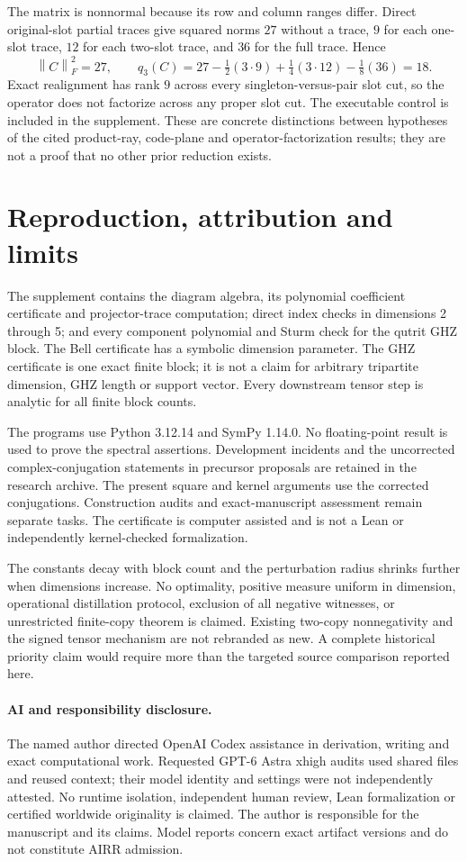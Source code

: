 \documentclass[11pt,a4paper]{article}
\newcommand{\norm}[1]{\left\lVert#1\right\rVert}
\begin{document}
The matrix is nonnormal because its row and column ranges differ. Direct original-slot partial traces give squared norms $27$ without a trace, $9$ for each one-slot trace, $12$ for each two-slot trace, and $36$ for the full trace. Hence
\[
 \norm C_F^2=27,\qquad q_3(C)=27-\tfrac12(3\cdot9)
                    +\tfrac14(3\cdot12)-\tfrac18(36)=18.
\]
Exact realignment has rank $9$ across every singleton-versus-pair slot cut, so the operator does not factorize across any proper slot cut. The executable control is included in the supplement. These are concrete distinctions between hypotheses of the cited product-ray, code-plane and operator-factorization results; they are not a proof that no other prior reduction exists.

\section{Reproduction, attribution and limits}
The supplement contains the diagram algebra, its polynomial coefficient certificate and projector-trace computation; direct index checks in dimensions 2 through 5; and every component polynomial and Sturm check for the qutrit GHZ block. The Bell certificate has a symbolic dimension parameter. The GHZ certificate is one exact finite block; it is not a claim for arbitrary tripartite dimension, GHZ length or support vector. Every downstream tensor step is analytic for all finite block counts.

The programs use Python 3.12.14 and SymPy 1.14.0. No floating-point result is used to prove the spectral assertions. Development incidents and the uncorrected complex-conjugation statements in precursor proposals are retained in the research archive. The present square and kernel arguments use the corrected conjugations. Construction audits and exact-manuscript assessment remain separate tasks. The certificate is computer assisted and is not a Lean or independently kernel-checked formalization.

The constants decay with block count and the perturbation radius shrinks further when dimensions increase. No optimality, positive measure uniform in dimension, operational distillation protocol, exclusion of all negative witnesses, or unrestricted finite-copy theorem is claimed. Existing two-copy nonnegativity and the signed tensor mechanism are not rebranded as new. A complete historical priority claim would require more than the targeted source comparison reported here.

\paragraph{AI and responsibility disclosure.}
The named author directed OpenAI Codex assistance in derivation, writing and exact computational work. Requested GPT-6 Astra xhigh audits used shared files and reused context; their model identity and settings were not independently attested. No runtime isolation, independent human review, Lean formalization or certified worldwide originality is claimed. The author is responsible for the manuscript and its claims. Model reports concern exact artifact versions and do not constitute AIRR admission.
\end{document}
